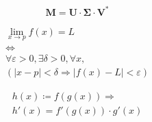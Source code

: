 \documentclass{article}%
\begin{document}
%
\normalsize%
\begin{center}%
\begin{equation*}
    \mathbf{M}=
    \mathbf{U}\cdot
    \mathbf{\Sigma}\cdot
    \mathbf{V}^{*}
\end{equation*}

\vspace{1cm} %

\begin{equation*}
    \begin{gathered}
    \lim_{x \to p} f(x) = L \\
    \iff \\
    \forall \varepsilon > 0, \exists \delta > 0, \forall x, \\
    (|x - p| < \delta \Rightarrow |f(x) - L| < \varepsilon)
    \end{gathered}
\end{equation*}

\vspace{1cm} %

\begin{equation*}
    \begin{gathered}
    h(x) \coloneq f(g(x)) \Rightarrow \\
    h'(x) = f'(g(x)) \cdot g'(x)
    \end{gathered}
\end{equation*}%
\end{center}%
\end{document}
